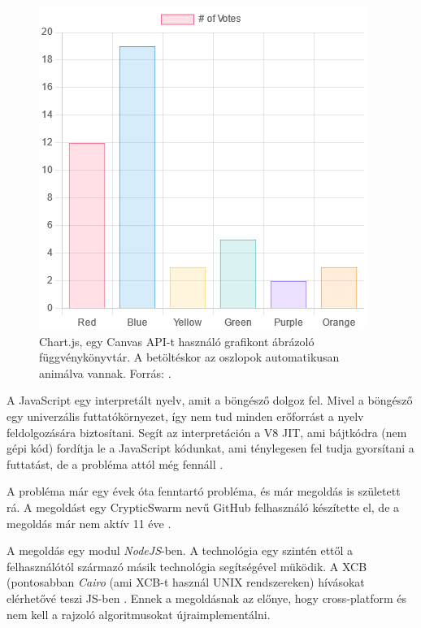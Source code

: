 \begin{figure}[h!]
    \centering
    \includegraphics[height=8truecm]{images/chartjs-demo.png}
    \caption{Chart.js, egy Canvas API-t használó grafikont ábrázoló függvénykönyvtár. A betöltéskor az oszlopok automatikusan animálva vannak. Forrás: \cite{da2019learn}.}
    \label{fig:chart.js}
\end{figure}


A JavaScript egy interpretált nyelv, amit a böngésző dolgoz fel. Mivel a böngésző egy univerzális futtatókörnyezet, így nem tud minden erőforrást a nyelv feldolgozására biztosítani. Segít az interpretáción a V8 JIT, ami bájtkódra (nem gépi kód) fordítja le a JavaScript kódunkat, ami ténylegesen fel tudja gyorsítani a futtatást, de a probléma attól még fennáll \cite{v8-jit}.


A probléma már egy évek óta fenntartó probléma, és már megoldás is született rá. A megoldást egy CrypticSwarm nevű GitHub felhasználó készítette el, de a megoldás már nem aktív 11 éve \cite{alt-xcbcanvas}.

A megoldás egy modul \textit{NodeJS}-ben. A technológia egy szintén ettől a felhasználótól származó másik technológia segítségével müködik. A XCB (pontosabban \textit{Cairo} (ami XCB-t használ UNIX rendszereken) hívásokat elérhetővé teszi JS-ben \cite{xcbjs}. Ennek a megoldásnak az előnye, hogy cross-platform és nem kell a rajzoló algoritmusokat újraimplementálni.